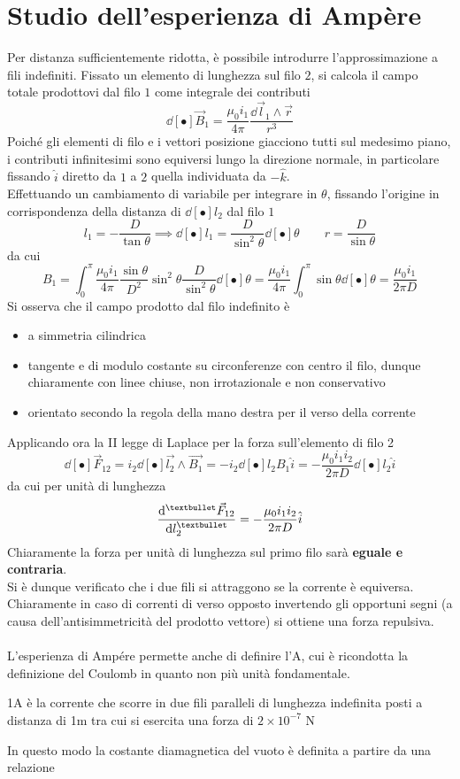 \section{Studio dell'esperienza di Ampère}
Per distanza sufficientemente ridotta, è possibile introdurre l'approssimazione a fili indefiniti. Fissato un elemento di lunghezza sul filo $2$, si calcola il campo totale prodottovi dal filo $1$ come integrale dei contributi
\[\dd[•]{\vec{B}_1} = \frac{\mu_0 i_1}{4 \pi} \frac{\dd{\vec{l}_1} \wedge \vec{r}}{r^3}\]
Poiché gli elementi di filo e i vettori posizione giacciono tutti sul medesimo piano, i contributi infinitesimi sono equiversi lungo la direzione normale, in particolare fissando $\hat{i}$ diretto da $1$ a $2$ quella individuata da $- \hat{k}$.
\\Effettuando un cambiamento di variabile per integrare in $\theta$, fissando l'origine in corrispondenza della distanza di $\dd[•]{l_2}$ dal filo $1$
\[l_1 = - \frac{D}{\tan \theta} \implies \dd[•]{l_1} = \frac{D}{\sin^2 \theta} \dd[•]{\theta} \qquad r = \frac{D}{\sin \theta}\]
da cui
\[B_1 = \int_0^\pi \frac{\mu_0 i_1}{4 \pi} \frac{\sin \theta}{D^2} \sin^2 \theta \frac{D}{\sin^2 \theta} \dd[•]{\theta} = \frac{\mu_0 i_1}{4 \pi}  \int_0^\pi \sin \theta \dd[•]{\theta} = \frac{\mu_0 i_1}{2 \pi D}\]
Si osserva che il campo prodotto dal filo indefinito è
\begin{itemize}
\item a simmetria cilindrica
\item tangente e di modulo costante su circonferenze con centro il filo, dunque chiaramente con linee chiuse, non irrotazionale e non conservativo
\item orientato secondo la regola della mano destra per il verso della corrente 
\end{itemize}

Applicando ora la II legge di Laplace per la forza sull'elemento di filo 2
\[\dd[•]{\vec{F}_{12}} = i_2 \dd[•]{\vec{l_2}} \wedge \vec{B_1} = - i_2 \dd[•]{l_2} B_1 \hat{i} = - \frac{\mu_0 i_1 i_2}{2 \pi D} \dd[•]{l_2} \hat{i}\]
da cui per unità di lunghezza
\[\dv[•]{\vec{F}_{12}}{l_2} = - \frac{\mu_0 i_1 i_2}{2 \pi D} \hat{i}\]
Chiaramente la forza per unità di lunghezza sul primo filo sarà \textbf{eguale e contraria}.
\\Si è dunque verificato che i due fili si attraggono se la corrente è equiversa. Chiaramente in caso di correnti di verso opposto invertendo gli opportuni segni (a causa dell'antisimmetricità del prodotto vettore) si ottiene una forza repulsiva.
\\~\\
L'esperienza di Ampére permette anche di definire l'A, cui è ricondotta la definizione del Coulomb in quanto non più unità fondamentale.
\begin{center}
1A è la corrente che scorre in due fili paralleli di lunghezza indefinita posti a distanza di 1m tra cui si esercita una forza di $2 \times 10^{-7}$ N
\end{center}
In questo modo la costante diamagnetica del vuoto è definita a partire da una relazione 

